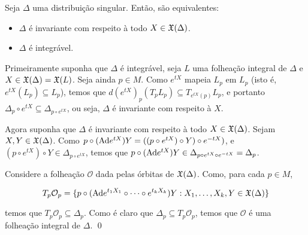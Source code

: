 \begin{theorem}
    Seja $\Delta$ uma distribuição singular. Então, são equivalentes:

    \begin{itemize}
        \item $\Delta$ é invariante com respeito à todo $X \in \mathfrak{X}(\Delta)$.
        \item $\Delta$ é integrável.
    \end{itemize}
\end{theorem}

\dem Primeiramente suponha que $\Delta$ é integrável, seja $L$ uma folheação integral
de $\Delta$ e $X \in \mathfrak{X}(\Delta) = \mathfrak{X}(L)$. Seja ainda $p \in M$. Como $e^{tX}$ mapeia
$L_p$ em $L_p$ (isto é, $e^{tX}(L_p) \subseteq L_p$), temos
que $d(e^{tX})_p (T_p L_p) \subseteq T_{e^{tX}(p)} L_p$, e portanto
$\Delta_p \circ e^{tX} \subseteq \Delta_{p \circ e^{tX}}$, ou seja,
$\Delta$ é invariante com respeito à $X$.

Agora suponha que $\Delta$ é invariante com respeito à todo $X \in \mathfrak{X}(\Delta)$.
Sejam $X, Y \in \mathfrak{X}(\Delta)$.
Como $p \circ (\text{Ad} e^{tX}) Y = ((p \circ e^{tX}) \circ Y) \circ e^{-tX})$,
e $(p \circ e^{tX}) \circ Y \in \Delta_{p \circ e^{tX}}$, temos que
$p \circ (\text{Ad} e^{tX}) Y \in \Delta_{p \circ e^{tX}\circ e^{-tX}}= \Delta_p$.

Considere a folheação $\mathcal{O}$ dada pelas órbitas de $\mathfrak{X}(\Delta)$.
Como, para cada $p \in M$,

$$T_p \mathcal{O}_p = \{p \circ (\text{Ad} e^{t_1 X_1} \circ \dots \circ e^{t_kX_k}) Y : X_1, \dots, X_k, Y \in \mathfrak{X}(\Delta)\}$$

temos que $T_p \mathcal{O}_p \subseteq \Delta_p$. Como é claro que $\Delta_p \subseteq T_p \mathcal{O}_p$,
temos que $\mathcal{O}$ é uma folheação integral de $\Delta$. \qed
